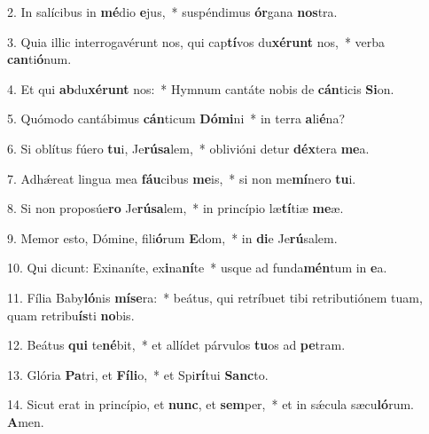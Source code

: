 2. In salícibus in \textbf{mé}dio \textbf{e}jus,~*  suspéndimus \textbf{ór}gana \textbf{nos}tra.\

3. Quia illic interrogavérunt nos, qui cap\textbf{tí}vos du\textbf{xé}\textbf{runt} nos,~*  verba \textbf{can}ti\textbf{ó}num.\

4. Et qui \textbf{ab}du\textbf{xé}\textbf{runt} nos:~*  Hymnum cantáte nobis de \textbf{cán}ticis \textbf{Si}on.\

5. Quómodo cantábimus \textbf{cán}ticum \textbf{Dó}\textbf{mi}ni~*  in terra \textbf{a}li\textbf{é}na?\

6. Si oblítus fúero \textbf{tu}i, Je\textbf{rú}\textbf{sa}lem,~*  oblivióni detur \textbf{déx}tera \textbf{me}a.\

7. Adhǽreat lingua mea \textbf{fáu}cibus \textbf{me}is,~*  si non me\textbf{mí}nero \textbf{tu}i.\

8. Si non proposúe\textbf{ro} Je\textbf{rú}\textbf{sa}lem,~*  in princípio læ\textbf{tí}tiæ \textbf{me}æ.\

9. Memor esto, Dómine, fili\textbf{ó}rum \textbf{E}dom,~*  in \textbf{di}e Je\textbf{rú}salem.\

10. Qui dicunt: Exinaníte, ex\textbf{i}na\textbf{ní}te~*  usque ad funda\textbf{mén}tum in \textbf{e}a.\

11. Fília Baby\textbf{ló}nis \textbf{mí}\textbf{se}ra:~*  beátus, qui retríbuet tibi retributiónem tuam, quam retribu\textbf{ís}ti \textbf{no}bis.\

12. Beátus \textbf{qui} te\textbf{né}bit,~*  et allídet párvulos \textbf{tu}os ad \textbf{pe}tram.\

13. Glória \textbf{Pa}tri, et \textbf{Fí}\textbf{li}o,~*  et Spi\textbf{rí}tui \textbf{Sanc}to.\

14. Sicut erat in princípio, et \textbf{nunc}, et \textbf{sem}per,~*  et in sǽcula sæcu\textbf{ló}rum. \textbf{A}men.\

